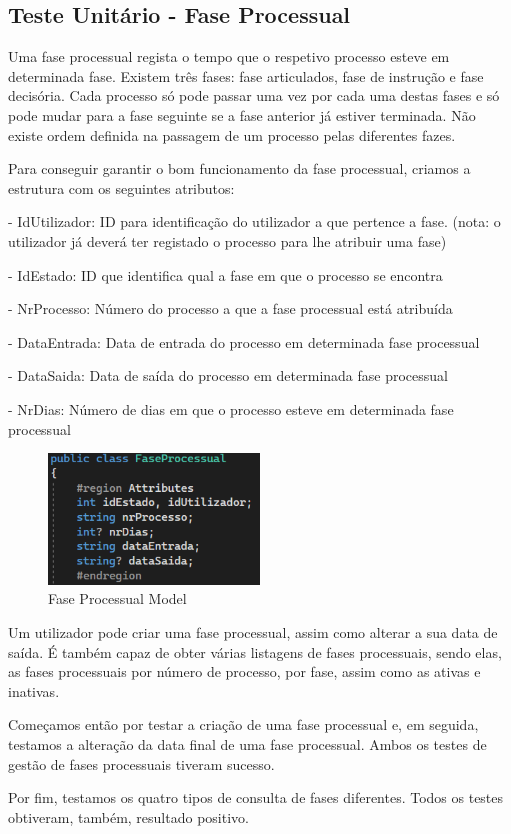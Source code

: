 \subsection{Teste Unitário - Fase Processual}
\indent \par Uma fase processual regista o tempo que o respetivo processo esteve em determinada fase. Existem três fases: fase articulados, fase de instrução e fase decisória. Cada processo só pode passar uma vez por cada uma destas fases e só pode mudar para a fase seguinte se a fase anterior já estiver terminada. Não existe ordem definida na passagem de um processo pelas diferentes fazes.
\indent \par Para conseguir garantir o bom funcionamento da fase processual, criamos a estrutura com os seguintes atributos:
\indent \par - IdUtilizador: ID para identificação do utilizador a que pertence a fase. (nota: o utilizador já deverá ter registado o processo para lhe atribuir uma fase)
\indent \par - IdEstado: ID que identifica qual a fase em que o processo se encontra
\indent \par - NrProcesso: Número do processo a que a fase processual está atribuída
\indent \par - DataEntrada: Data de entrada do processo em determinada fase processual
\indent \par - DataSaida: Data de saída do processo em determinada fase processual
\indent \par - NrDias: Número de dias em que o processo esteve em determinada fase processual

\begin{figure}[!h]
\centering
\includegraphics[width=0.5\textwidth]{Figuras/Models/FaseProcessualModel.png}
\caption{Fase Processual Model}
\label{d.model}
\end{figure}

\newpage
\indent \par Um utilizador pode criar uma fase processual, assim como alterar a sua data de saída. É também capaz de obter várias listagens de fases processuais, sendo elas, as fases processuais por número de processo,
por fase, assim como as ativas e inativas.
\indent \par Começamos então por testar a criação de uma fase processual e, em seguida, testamos a alteração da data final de uma fase processual. Ambos os testes de gestão de fases processuais tiveram sucesso.
\indent \par Por fim, testamos os quatro tipos de consulta de fases diferentes. Todos os testes obtiveram, também, resultado positivo.

